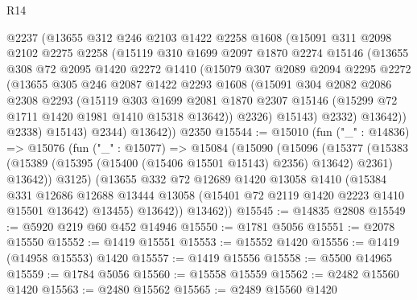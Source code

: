 \begin{lexlean}{R14}
\begin{coremodule}
          @2237
          (@13655
            @312
            @246
            @2103
            @1422
            @2258
            @1608
            (@15091
              @311
              @2098
              @2102
              @2275
              @2258
              (@15119
                @310
                @1699
                @2097
                @1870
                @2274
                @15146
                (@13655
                  @308
                  @72
                  @2095
                  @1420
                  @2272
                  @1410
                  (@15079
                    @307
                    @2089
                    @2094
                    @2295
                    @2272
                    (@13655
                      @305
                      @246
                      @2087
                      @1422
                      @2293
                      @1608
                      (@15091
                        @304
                        @2082
                        @2086
                        @2308
                        @2293
                        (@15119
                          @303
                          @1699
                          @2081
                          @1870
                          @2307
                          @15146
                          (@15299 @72 @1711 @1420 @1981 @1410 @15318 @13642))
                        @2326)
                      @15143)
                    @2332)
                  @13642))
              @2338)
            @15143)
          @2344)
        @13642))
    @2350
@15544 := @15010
    (fun ("_" : @14836) =>
    @15076
      (fun ("_" : @15077) =>
      @15084
        (@15090
          (@15096
            (@15377
              (@15383 (@15389 (@15395 (@15400 (@15406 @15501 @15143) @2356) @13642) @2361) @13642))
            @3125)
          (@13655
            @332
            @72
            @12689
            @1420
            @13058
            @1410
            (@15384
              @331
              @12686
              @12688
              @13444
              @13058
              (@15401 @72 @2119 @1420 @2223 @1410 @15501 @13642)
              @13455)
            @13642))
        @13462))
@15545 := @14835 @2808
@15549 := @5920 @219 @60 @452 @14946
@15550 := @1781 @5056
@15551 := @2078 @15550
@15552 := @1419 @15551
@15553 := @15552 @1420
@15556 := @1419 (@14958 @15553) @1420
@15557 := @1419 @15556
@15558 := @5500 @14965
@15559 := @1784 @5056
@15560 := @15558 @15559
@15562 := @2482 @15560 @1420
@15563 := @2480 @15562
@15565 := @2489 @15560 @1420

\end{coremodule}
\end{lexlean}
